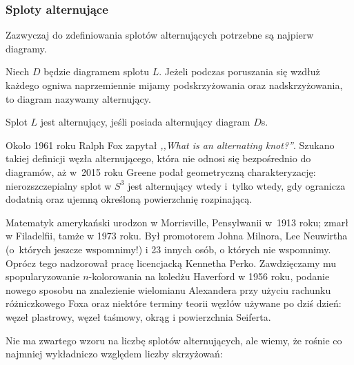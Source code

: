 
\subsubsection{Sploty alternujące}

Zazwyczaj do zdefiniowania splotów alternujących potrzebne są najpierw diagramy.

\begin{definition}
\label{def:alternating_link}%
%
    Niech $D$ będzie diagramem splotu $L$.
    Jeżeli podczas poruszania się wzdłuż każdego ogniwa naprzemiennie mijamy podskrzyżowania oraz nadskrzyżowania, to diagram nazywamy alternujący.
    
    Splot $L$ jest alternujący, jeśli posiada alternujący diagram $D$s.
\end{definition}

Około 1961 roku Ralph Fox zapytał \emph{,,What is an alternating knot?''}.
%
Szukano takiej definicji węzła alternującego, która nie odnosi się bezpośrednio do diagramów, aż w~2015 roku Greene \cite{greene2017} podał geometryczną charakteryzację: nierozszczepialny splot w $S^3$ jest alternujący wtedy i~tylko wtedy, gdy ogranicza dodatnią oraz ujemną określoną powierzchnię rozpinającą.
%

\begin{remark}
    Matematyk amerykański urodzon w Morrisville, Pensylwanii w~1913 roku; zmarł w Filadelfii, tamże w 1973 roku.
    Był promotorem Johna Milnora, Lee Neuwirtha (o~których jeszcze wspomnimy!) i 23 innych osób, o których nie wspomnimy.
    Oprócz tego nadzorował pracę licencjacką Kennetha Perko.
    Zawdzięczamy mu spopularyzowanie $n$-kolorowania na koledżu Haverford w 1956 roku, podanie nowego sposobu na znalezienie wielomianu Alexandera przy użyciu rachunku różniczkowego Foxa oraz niektóre terminy teorii węzłów używane po dziś dzień: węzeł plastrowy, węzeł taśmowy, okrąg i powierzchnia Seiferta.
\end{remark}

Nie ma zwartego wzoru na liczbę splotów alternujących, ale wiemy, że rośnie co najmniej wykładniczo względem liczby skrzyżowań:

